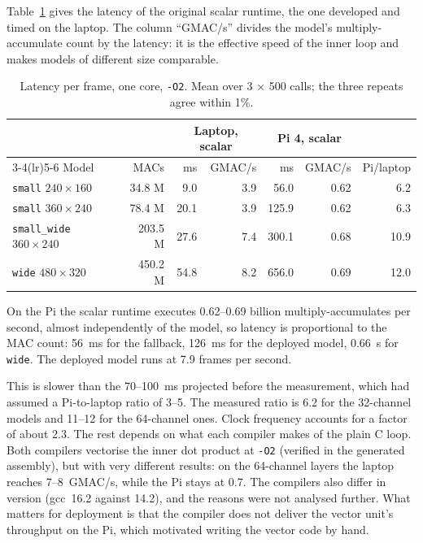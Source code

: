 \documentclass[11pt,a4paper]{article}
\newcommand{\cfg}[1]{\texttt{#1}}
\begin{document}
Table~\ref{tab:latency} gives the latency of the original scalar runtime,
the one developed and timed on the laptop. The column ``GMAC/s'' divides the
model's multiply-accumulate count by the latency: it is the effective speed
of the inner loop and makes models of different size comparable.

\begin{table}[h]
\centering
\caption{Latency per frame, one core, \texttt{-O2}. Mean over 3 $\times$ 500
calls; the three repeats agree within 1\%.}
\label{tab:latency}
\begin{tabular}{lrrrrrr}
\toprule
 & & \multicolumn{2}{c}{Laptop, scalar} & \multicolumn{2}{c}{Pi 4, scalar} & \\
\cmidrule(lr){3-4}\cmidrule(lr){5-6}
Model & MACs & ms & GMAC/s & ms & GMAC/s & Pi/laptop \\
\midrule
\cfg{small} $240 \times 160$ & 34.8 M & 9.0 & 3.9 & 56.0 & 0.62 & 6.2 \\
\cfg{small} $360 \times 240$ & 78.4 M & 20.1 & 3.9 & 125.9 & 0.62 & 6.3 \\
\cfg{small\_wide} $360 \times 240$ & 203.5 M & 27.6 & 7.4 & 300.1 & 0.68 & 10.9 \\
\cfg{wide} $480 \times 320$ & 450.2 M & 54.8 & 8.2 & 656.0 & 0.69 & 12.0 \\
\bottomrule
\end{tabular}
\end{table}

On the Pi the scalar runtime executes 0.62--0.69 billion multiply-accumulates
per second, almost independently of the model, so latency is proportional to
the MAC count: 56~ms for the fallback, 126~ms for the deployed model, 0.66~s
for \cfg{wide}. The deployed model runs at 7.9 frames per second.

This is slower than the 70--100~ms projected before the measurement, which
had assumed a Pi-to-laptop ratio of 3--5. The measured ratio is 6.2 for the
32-channel models and 11--12 for the 64-channel ones. Clock frequency
accounts for a factor of about 2.3. The rest depends on what each compiler
makes of the plain C loop. Both compilers vectorise the inner dot product at
\texttt{-O2} (verified in the generated assembly), but with very different
results: on the 64-channel layers the laptop reaches 7--8~GMAC/s, while the
Pi stays at 0.7. The compilers also differ in version (gcc~16.2 against
14.2), and the reasons were not analysed further. What matters for
deployment is that the compiler does not deliver the vector unit's
throughput on the Pi, which motivated writing the vector code by hand.
\end{document}
